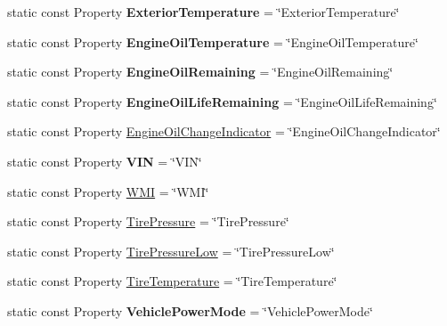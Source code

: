 \begin{DoxyCompactItemize}
\item 
\hypertarget{classVehicleProperty_ad9510186dc9ef236b59743371f093d36}{static const Property {\bfseries Exterior\+Temperature} = \char`\"{}Exterior\+Temperature\char`\"{}}\label{classVehicleProperty_ad9510186dc9ef236b59743371f093d36}

\item 
\hypertarget{classVehicleProperty_a9d4a610d94b12f139ea00b271804a73f}{static const Property {\bfseries Engine\+Oil\+Temperature} = \char`\"{}Engine\+Oil\+Temperature\char`\"{}}\label{classVehicleProperty_a9d4a610d94b12f139ea00b271804a73f}

\item 
\hypertarget{classVehicleProperty_aeeece192dedcd20cb112dea6905aa80c}{static const Property {\bfseries Engine\+Oil\+Remaining} = \char`\"{}Engine\+Oil\+Remaining\char`\"{}}\label{classVehicleProperty_aeeece192dedcd20cb112dea6905aa80c}

\item 
\hypertarget{classVehicleProperty_a7e690079ef7c33d03ee393c908590369}{static const Property {\bfseries Engine\+Oil\+Life\+Remaining} = \char`\"{}Engine\+Oil\+Life\+Remaining\char`\"{}}\label{classVehicleProperty_a7e690079ef7c33d03ee393c908590369}

\item 
static const Property \hyperlink{classVehicleProperty_a6d35870db03580d6e912fc49dd889bc7}{Engine\+Oil\+Change\+Indicator} = \char`\"{}Engine\+Oil\+Change\+Indicator\char`\"{}
\item 
\hypertarget{classVehicleProperty_ae72c1c7de185f330862c62dfb9d93a34}{static const Property {\bfseries V\+I\+N} = \char`\"{}V\+I\+N\char`\"{}}\label{classVehicleProperty_ae72c1c7de185f330862c62dfb9d93a34}

\item 
static const Property \hyperlink{classVehicleProperty_a32f980d900d97cf94171ea9fa25408e0}{W\+M\+I} = \char`\"{}W\+M\+I\char`\"{}
\item 
static const Property \hyperlink{classVehicleProperty_a4709c7da616ca84dd4533562319d9bb8}{Tire\+Pressure} = \char`\"{}Tire\+Pressure\char`\"{}
\item 
static const Property \hyperlink{classVehicleProperty_a39e0314efcb1040a285d8d71ff5cd701}{Tire\+Pressure\+Low} = \char`\"{}Tire\+Pressure\+Low\char`\"{}
\item 
static const Property \hyperlink{classVehicleProperty_a6ec2a936e26226d1cb9fb84262e6adc2}{Tire\+Temperature} = \char`\"{}Tire\+Temperature\char`\"{}
\item 
\hypertarget{classVehicleProperty_a80cc1f343da6754346e4bcc0cc7ae009}{static const Property {\bfseries Vehicle\+Power\+Mode} = \char`\"{}Vehicle\+Power\+Mode\char`\"{}}\label{classVehicleProperty_a80cc1f343da6754346e4bcc0cc7ae009}


\end{DoxyCompactItemize}
